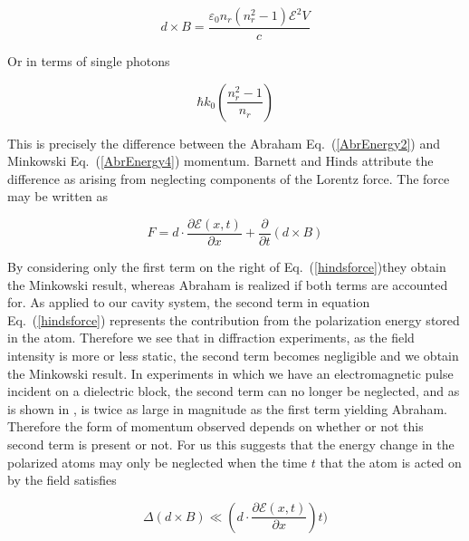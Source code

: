 \begin{equation}
d \times B =\frac{\varepsilon_{0} n_{r}\left(n_{r}^2-1\right)\mathcal{E}^2V}{c}
\label{dipoleterm1}
\end{equation}

Or in terms of single photons

\begin{equation}
\hbar k_{0} \left(\frac{n_{r}^2-1}{n_{r}}\right)
\label{dipoleterm2}
\end{equation}

This is precisely the difference between the Abraham Eq.\ (\ref{AbrEnergy2}) and Minkowski Eq.\ (\ref{AbrEnergy4}) momentum. 
Barnett and Hinds \cite{Hinds} attribute the difference as arising from neglecting components of the Lorentz force.  The force may be written as 
  
\begin{equation}
F=d \cdot \frac{\partial\mathcal{E}(x,t)}{\partial x} + \frac{\partial}{\partial t}\left(d \times B \right)
\label{hindsforce}
\end{equation}

By considering only the first term on the right of Eq.\ (\ref{hindsforce})they obtain the Minkowski result, whereas Abraham is realized if both terms are accounted for. As applied to our cavity system, the second term in equation Eq.\ (\ref{hindsforce}) represents the contribution from the polarization energy stored in the atom. Therefore we see that in diffraction experiments, as the field intensity is more or less static, the second term becomes negligible and we obtain the Minkowski result.  In experiments in which we have an electromagnetic pulse incident on a dielectric block, the second term can no longer be neglected, and as is shown in \cite{Hinds}, is twice as large in magnitude as the first term yielding Abraham.  Therefore the form of momentum observed depends on whether or not this second term is present or not.  For us this suggests that the energy change in the polarized atoms may only be neglected when the time $t$ that the atom is acted on by the field satisfies


\begin{equation}
\Delta \left(d \times B \right) \ll  \left(d \cdot \frac{\partial\mathcal{E}(x,t)}{\partial x}\right)t)
\label{timecompare}
\end{equation}





